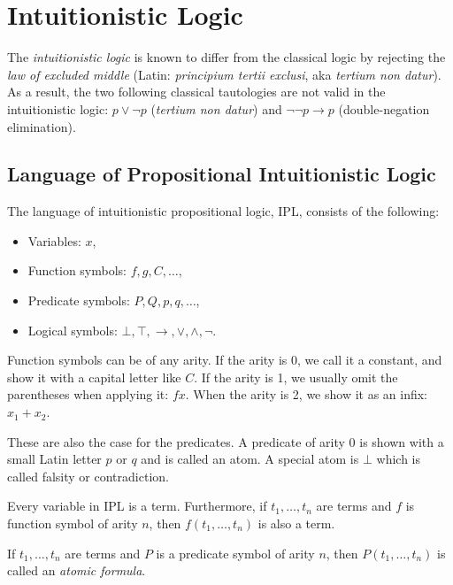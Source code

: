 \section{Intuitionistic Logic}

The \textit{intuitionistic logic} is known to differ from the classical logic by rejecting the \textit{law of excluded middle} (Latin: \textit{principium tertii exclusi}, aka \textit{tertium non datur}). As a result, the two following classical tautologies are not valid in the intuitionistic logic: $p \vee \neg p$ (\textit{tertium non datur}) and $\neg \neg p \rightarrow p$ (double-negation elimination).

\subsection{Language of Propositional Intuitionistic Logic}

The language of intuitionistic propositional logic, IPL, consists of the following:

\begin{itemize}
    \item Variables: $x$,
    \item Function symbols: $f, g, C, \dots$,
    \item Predicate symbols: $P, Q, p, q, \dots$,
    \item Logical symbols: $\bot, \top, \rightarrow, \vee, \wedge, \neg$.
\end{itemize}

Function symbols can be of any arity. If the arity is 0, we call it a constant, and show it with a capital letter like $C$. If the arity is 1, we usually omit the parentheses when applying it: $fx$. When the arity is 2, we show it as an infix: $x_1 + x_2$.

These are also the case for the predicates. A predicate of arity 0 is shown with a small Latin letter $p$ or $q$ and is called an atom. A special atom is $\bot$ which is called falsity or contradiction.

\begin{definition}[Term]
Every variable in IPL is a term. Furthermore, if $t_1, \dots, t_n$ are terms and $f$ is function symbol of arity $n$, then $f(t_1, \dots, t_{n})$ is also a term.
\end{definition}

\begin{definition}
If $t_1, \dots, t_n$ are terms and $P$ is a predicate symbol of arity $n$, then $P(t_1, \dots, t_n)$ is called an \textit{atomic formula}.
\end{definition}

